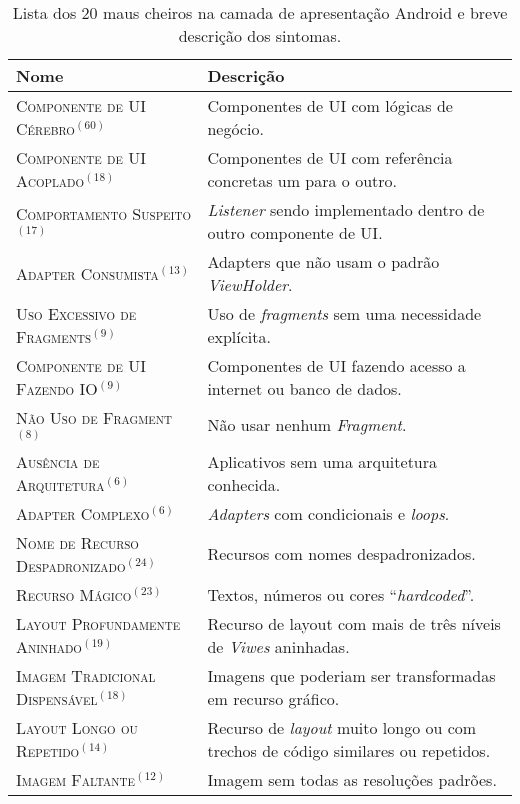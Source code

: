\begin{table}[h!]
\centering
\renewcommand*{\arraystretch}{1}
\caption{Lista dos 20 maus cheiros na camada de apresentação Android e breve descrição dos sintomas.}
\footnotesize 
\begin{tabular}{@{}p{6.6cm}@{}p{10cm}@{}}
\toprule
\textbf{Nome} & \textbf{Descrição} \\ 
\toprule
\textsc{Componente de UI Cérebro}$^{(60)}$            & Componentes de UI com lógicas de negócio.  \\
\textsc{Componente de UI Acoplado}$^{(18)}$           & Componentes de UI com referência concretas um para o outro.  \\
\textsc{Comportamento Suspeito}$^{(17)}$              & \textit{Listener} sendo implementado dentro de outro componente de UI.  \\
\textsc{Adapter Consumista}$^{(13)}$                  & Adapters que não usam o padrão \textit{ViewHolder}.  \\
\textsc{Uso Excessivo de Fragments}$^{(9)}$           & Uso de \textit{fragments} sem uma necessidade explícita. \\
\textsc{Componente de UI Fazendo IO}$^{(9)}$          & Componentes de UI fazendo acesso a internet ou banco de dados.  \\
\textsc{Não Uso de Fragment}$^{(8)}$                  & Não usar nenhum \textit{Fragment}.  \\
\textsc{Ausência de Arquitetura}$^{(6)}$              & Aplicativos sem uma arquitetura conhecida.  \\
\textsc{Adapter Complexo}$^{(6)}$                     & \textit{Adapters} com condicionais e \textit{loops}. \\
\textsc{Nome de Recurso Despadronizado}$^{(24)}$      & Recursos com nomes despadronizados.      \\
\textsc{Recurso Mágico}$^{(23)}$                      & Textos, números ou cores ``\textit{hardcoded}''.   \\
\textsc{Layout Profundamente Aninhado}$^{(19)}$       & Recurso de layout com mais de três níveis de \textit{Viwes} aninhadas.   \\
\textsc{Imagem Tradicional Dispensável}$^{(18)}$      & Imagens que poderiam ser transformadas em recurso gráfico.   \\
\textsc{Layout Longo ou Repetido}$^{(14)}$            & Recurso de \textit{layout} muito longo ou com trechos de código similares ou repetidos.   \\
\textsc{Imagem Faltante}$^{(12)}$                     & Imagem sem todas as resoluções padrões.   \\

\end{tabular}
\end{table}

